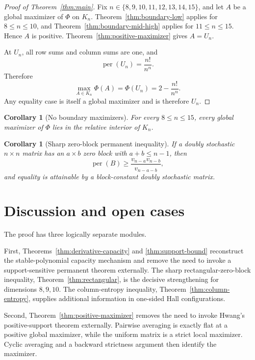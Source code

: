 \documentclass[11pt]{article}
\newtheorem{corollary}[theorem]{Corollary}
\theoremstyle{definition}
\newcommand{\per}{\operatorname{per}}
\newcommand{\1}{\mathbf{1}}
\begin{document}
\begin{proof}[Proof of Theorem~\ref{thm:main}]
Fix $n\in\{8,9,10,11,12,13,14,15\}$, and let $A$ be a global maximizer of $\Phi$ on $K_n$.  Theorem~\ref{thm:boundary-low} applies for $8\le n\le10$, and Theorem~\ref{thm:boundary-mid-high} applies for $11\le n\le15$.  Hence $A$ is positive.  Theorem~\ref{thm:positive-maximizer} gives $A=U_n$.

At $U_n$, all row sums and column sums are one, and
\[
 \per(U_n)=\frac{n!}{n^n}.
\]
Therefore
\[
 \max_{A\in K_n}\Phi(A)
 =\Phi(U_n)
 =2-\frac{n!}{n^n}.
\]
Any equality case is itself a global maximizer and is therefore $U_n$.
\end{proof}

\begin{corollary}[No boundary maximizers]\label{cor:no-boundary}
For every $8\le n\le15$, every global maximizer of $\Phi$ lies in the relative interior of $K_n$.
\end{corollary}

\begin{corollary}[Sharp zero-block permanent inequality]\label{cor:sharp-block-restated}
If a doubly stochastic $n\times n$ matrix has an $a\times b$ zero block with $a+b\le n-1$, then
\[
 \per(B)\ge\frac{v_{n-a}v_{n-b}}{v_{n-a-b}},
\]
and equality is attainable by a block-constant doubly stochastic matrix.
\end{corollary}

\section{Discussion and open cases}\label{sec:discussion}

The proof has three logically separate modules.

First, Theorems~\ref{thm:derivative-capacity} and \ref{thm:support-bound} reconstruct the stable-polynomial capacity mechanism and remove the need to invoke a support-sensitive permanent theorem externally.  The sharp rectangular-zero-block inequality, Theorem~\ref{thm:rectangular}, is the decisive strengthening for dimensions $8,9,10$.  The column-entropy inequality, Theorem~\ref{thm:column-entropy}, supplies additional information in one-sided Hall configurations.

Second, Theorem~\ref{thm:positive-maximizer} removes the need to invoke Hwang's positive-support theorem externally.  Pairwise averaging is exactly flat at a positive global maximizer, while the uniform matrix is a strict local maximizer.  Cyclic averaging and a backward strictness argument then identify the maximizer.
\end{document}
